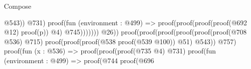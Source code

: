 \begin{lexlean}{Compose}
\begin{coremodule}
                                                                                                        @543))
                                                                                                  @731)
                                                                                                proof(fun (environment : @499) =>
                                                                                                  proof(proof(proof(proof(@692
                                                                                                            @12)
                                                                                                          proof(p))
                                                                                                        @4)
                                                                                                      @745)))))))
                                                                                  @26))
                                                                            proof(proof(proof(proof(proof(proof(@708
                                                                                          @536)
                                                                                        @715)
                                                                                      proof(proof(proof(@538
                                                                                              proof(@539
                                                                                                  @100))
                                                                                            @51)
                                                                                          @543))
                                                                                    @757)
                                                                                  proof(fun (x : @536) =>
                                                                                    proof(proof(proof(@735
                                                                                            @4)
                                                                                          @731)
                                                                                        proof(fun (environment : @499) =>
                                                                                          proof(@744
                                                                                              proof(@696

\end{coremodule}
\end{lexlean}
